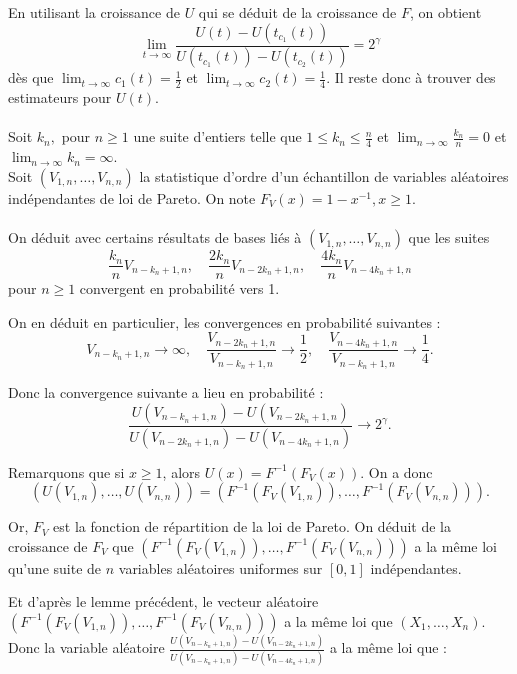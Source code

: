 \documentclass{article}
\theoremstyle{plain}
\theoremstyle{definition}
\theoremstyle{plain}
\begin{document}
\noindent En utilisant la croissance de $U$ qui se déduit de la croissance de $F$, on obtient
\[
\lim_{t \to \infty} \frac{U(t) - U(t_{c_1}(t))}{U(t_{c_1}(t)) - U(t_{c_2}(t))} = 2^{\gamma}
\]
dès que $\lim_{t \to \infty} c_1(t) = \frac{1}{2}$ et $\lim_{t \to \infty} c_2(t) = \frac{1}{4}$. Il reste donc à trouver des estimateurs pour $U(t)$.
\\
\\
Soit $k_n,$ pour $ n \geq 1$ une suite d’entiers telle que $1 \leq k_n \leq \frac{n}{4}$ et $\lim_{n \to \infty} \frac{k_n}{n} = 0$ et $\lim_{n \to \infty} k_n = \infty$.
\\
Soit $(V_{1,n},\dots,V_{n,n})$ la statistique d’ordre d’un échantillon de variables aléatoires indépendantes de loi de Pareto. On note $F_V(x) = 1 - x^{-1}, x \geq 1$.
\\
\\
\noindent On déduit avec certains résultats de bases liés à $(V_{1,n},\dots,V_{n,n})$ que les suites
\[
\frac{k_n}{n} V_{n-k_n+1,n}, \quad \frac{2k_n}{n} V_{n-2k_n+1,n}, \quad \frac{4k_n}{n} V_{n-4k_n+1,n}
\]
pour \(n \geq 1\) convergent en probabilité vers 1.

\noindent On en déduit en particulier, les convergences en probabilité suivantes :
\[
V_{n-k_n+1,n}  \to \infty, \quad \frac{V_{n-2k_n+1,n}}{V_{n-k_n+1,n}} \to \frac{1}{2}, \quad \frac{V_{n-4k_n+1,n}}{V_{n-k_n+1,n}} \to \frac{1}{4}.
\]

\noindent Donc la convergence suivante a lieu en probabilité :
\[
\frac{U(V_{n-k_n+1,n}) - U(V_{n-2k_n+1,n})}{U(V_{n-2k_n+1,n}) - U(V_{n-4k_n+1,n})} \to 2^{\gamma}.
\]

\noindent Remarquons que si $x \geq 1$, alors $U(x) = F^{-1}(F_V(x))$. On a donc
\[
(U(V_{1,n}), \dots, U(V_{n,n})) = (F^{-1}(F_V(V_{1,n})), \dots, F^{-1}(F_V(V_{n,n}))).
\]

\noindent Or, \(F_V\) est la fonction de répartition de la loi de Pareto. \newline
On déduit de la croissance de $F_V$ que $(F^{-1}(F_V(V_{1,n})),\dots, F^{-1}(F_V(V_{n,n})))$ a la même loi qu’une suite de $n$ variables aléatoires uniformes sur $[0,1]$ indépendantes. 

\noindent Et d'après le lemme précédent, le vecteur aléatoire $(F^{-1}(F_V(V_{1,n})),\dots, F^{-1}(F_V(V_{n,n})))$ a la même loi que $(X_1,\dots,X_n)$. \\

\noindent Donc la variable aléatoire \(\frac{U(V_{n-k_n+1,n}) - U(V_{n-2k_n+1,n})}{U(V_{n-k_n+1,n}) - U(V_{n-4k_n+1,n})}\) a la même loi que :
\end{document}
